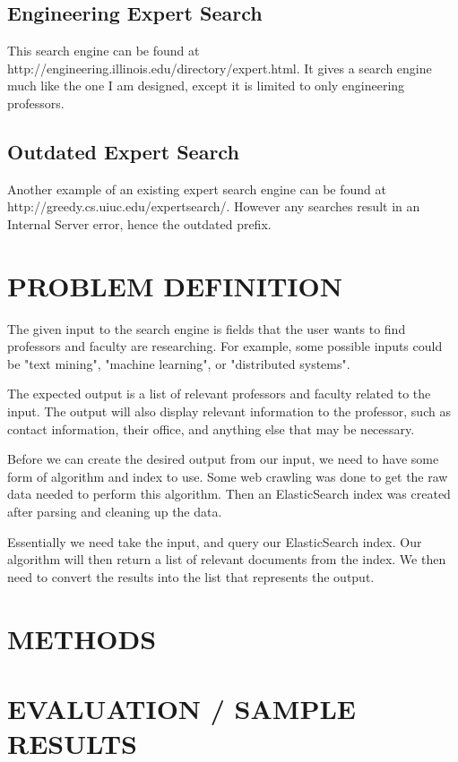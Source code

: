 \documentclass[letterpaper, 10 pt, conference]{ieeeconf}
\begin{document}
		\subsection{Engineering Expert Search}
		This search engine can be found at http://engineering.illinois.edu/directory/expert.html. It gives a search engine much like the one I am designed, except it is limited to only engineering professors.

		\subsection{Outdated Expert Search}
		Another example of an existing expert search engine can be found at http://greedy.cs.uiuc.edu/expertsearch/. However any searches result in an Internal Server error, hence the outdated prefix.

	\section{PROBLEM DEFINITION}
	The given input to the search engine is fields that the user wants to find professors and faculty are researching. For example, some possible inputs could be "text mining", "machine learning", or "distributed systems".

	The expected output is a list of relevant professors and faculty related to the input. The output will also display relevant information to the professor, such as contact information, their office, and anything else that may be necessary.

	Before we can create the desired output from our input, we need to have some form of algorithm and index to use. Some web crawling was done to get the raw data needed to perform this algorithm. Then an ElasticSearch index was created after parsing and cleaning up the data. 

	Essentially we need take the input, and query our ElasticSearch index. Our algorithm will then return a list of relevant documents from the index. We then need to convert the results into the list that represents the output.
	\section{METHODS}

	\section{EVALUATION / SAMPLE RESULTS}
\end{document}
